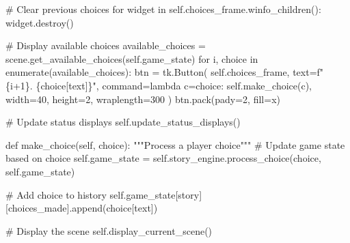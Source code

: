 \documentclass[
  letterpaper,
  DIV=11,
  numbers=noendperiod,
  oneside]{scrreprt}
\newenvironment{Shaded}{}{}
\newcommand{\BuiltInTok}[1]{\textcolor[rgb]{0.84,0.23,0.29}{#1}}
\newcommand{\CommentTok}[1]{\textcolor[rgb]{0.42,0.45,0.49}{#1}}
\newcommand{\ControlFlowTok}[1]{\textcolor[rgb]{0.84,0.23,0.29}{#1}}
\newcommand{\DecValTok}[1]{\textcolor[rgb]{0.00,0.36,0.77}{#1}}
\newcommand{\KeywordTok}[1]{\textcolor[rgb]{0.84,0.23,0.29}{#1}}
\newcommand{\NormalTok}[1]{\textcolor[rgb]{0.14,0.16,0.18}{#1}}
\newcommand{\OperatorTok}[1]{\textcolor[rgb]{0.14,0.16,0.18}{#1}}
\newcommand{\SpecialCharTok}[1]{\textcolor[rgb]{0.00,0.36,0.77}{#1}}
\newcommand{\SpecialStringTok}[1]{\textcolor[rgb]{0.01,0.18,0.38}{#1}}
\newcommand{\StringTok}[1]{\textcolor[rgb]{0.01,0.18,0.38}{#1}}
\newcommand{\VariableTok}[1]{\textcolor[rgb]{0.89,0.38,0.04}{#1}}
\begin{document}
\begin{Shaded}
\begin{Highlighting}[]
        \CommentTok{\# Clear previous choices}
        \ControlFlowTok{for}\NormalTok{ widget }\KeywordTok{in} \VariableTok{self}\NormalTok{.choices\_frame.winfo\_children():}
\NormalTok{            widget.destroy()}
        
        \CommentTok{\# Display available choices}
\NormalTok{        available\_choices }\OperatorTok{=}\NormalTok{ scene.get\_available\_choices(}\VariableTok{self}\NormalTok{.game\_state)}
        \ControlFlowTok{for}\NormalTok{ i, choice }\KeywordTok{in} \BuiltInTok{enumerate}\NormalTok{(available\_choices):}
\NormalTok{            btn }\OperatorTok{=}\NormalTok{ tk.Button(}
                \VariableTok{self}\NormalTok{.choices\_frame, }
\NormalTok{                text}\OperatorTok{=}\SpecialStringTok{f"}\SpecialCharTok{\{}\NormalTok{i}\OperatorTok{+}\DecValTok{1}\SpecialCharTok{\}}\SpecialStringTok{. }\SpecialCharTok{\{}\NormalTok{choice[}\StringTok{\textquotesingle{}text\textquotesingle{}}\NormalTok{]}\SpecialCharTok{\}}\SpecialStringTok{"}\NormalTok{, }
\NormalTok{                command}\OperatorTok{=}\KeywordTok{lambda}\NormalTok{ c}\OperatorTok{=}\NormalTok{choice: }\VariableTok{self}\NormalTok{.make\_choice(c),}
\NormalTok{                width}\OperatorTok{=}\DecValTok{40}\NormalTok{, height}\OperatorTok{=}\DecValTok{2}\NormalTok{, wraplength}\OperatorTok{=}\DecValTok{300}
\NormalTok{            )}
\NormalTok{            btn.pack(pady}\OperatorTok{=}\DecValTok{2}\NormalTok{, fill}\OperatorTok{=}\StringTok{\textquotesingle{}x\textquotesingle{}}\NormalTok{)}
        
        \CommentTok{\# Update status displays}
        \VariableTok{self}\NormalTok{.update\_status\_displays()}
    
    \KeywordTok{def}\NormalTok{ make\_choice(}\VariableTok{self}\NormalTok{, choice):}
        \CommentTok{"""Process a player choice"""}
        \CommentTok{\# Update game state based on choice}
        \VariableTok{self}\NormalTok{.game\_state }\OperatorTok{=} \VariableTok{self}\NormalTok{.story\_engine.process\_choice(choice, }\VariableTok{self}\NormalTok{.game\_state)}
        
        \CommentTok{\# Add choice to history}
        \VariableTok{self}\NormalTok{.game\_state[}\StringTok{\textquotesingle{}story\textquotesingle{}}\NormalTok{][}\StringTok{\textquotesingle{}choices\_made\textquotesingle{}}\NormalTok{].append(choice[}\StringTok{\textquotesingle{}text\textquotesingle{}}\NormalTok{])}
        
        \CommentTok{\# Display the scene}
        \VariableTok{self}\NormalTok{.display\_current\_scene()}
        

\end{Highlighting}
\end{Shaded}
\end{document}
